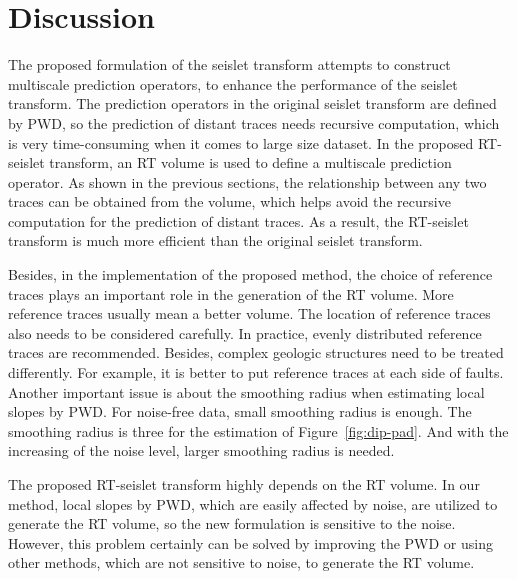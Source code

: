 \section{Discussion}
    The proposed formulation of the seislet transform attempts to construct 
    multiscale prediction operators, to enhance the performance of the 
    seislet transform. 
    The prediction operators in the original seislet transform are defined by 
    PWD, so the prediction of distant traces needs recursive computation, which 
    is very time-consuming when it comes to large size dataset. 
    In the proposed RT-seislet transform, an RT volume is used to define a 
    multiscale prediction operator. 
    As shown in the previous sections, the relationship between any two traces 
    can be obtained from the  volume, which helps 
    avoid the recursive computation for the prediction of distant traces. 
    As a result, the RT-seislet transform is much more efficient than the 
    original seislet transform.

    Besides, in the implementation of the proposed method, the choice of 
    reference traces plays an important role in the generation of the RT volume. 
    More reference traces usually mean a better  
    volume. 
    The location of reference traces also needs to be considered carefully. 
    In practice, evenly distributed reference traces are recommended.
    Besides, complex geologic structures need to be treated differently.
    For example, it is better to put reference traces at each side of faults. 
    Another important issue is about the smoothing radius when estimating local 
    slopes by PWD. 
    For noise-free data, small smoothing radius is enough. 
    The smoothing radius is three for the estimation of Figure~\ref{fig:dip-pad}. 
    And with the increasing of the noise level, larger smoothing radius is 
    needed. 

    The proposed RT-seislet transform highly depends on the RT volume. 
    In our method, local slopes by PWD, which are easily 
    affected by noise, are utilized to generate the RT volume, so the new 
    formulation is sensitive to the noise. 
    However, this problem certainly can be solved by improving the PWD or using 
    other methods, which are not sensitive to noise, to generate the RT volume.

